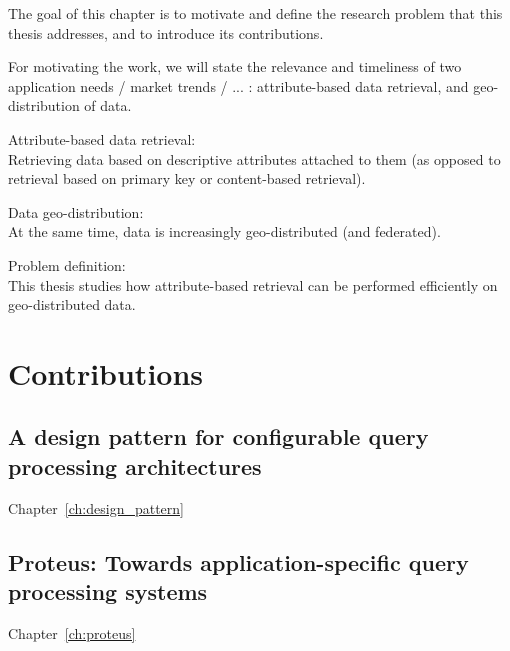 The goal of this chapter is to motivate and define the research problem that
this thesis addresses, and to introduce its contributions.

For motivating the work, we will state the relevance and timeliness of two
application needs / market trends / ... : attribute-based data retrieval, and
geo-distribution of data.

Attribute-based data retrieval: \\
Retrieving data based on descriptive attributes attached to them (as opposed to
retrieval based on primary key or content-based retrieval).

Data geo-distribution: \\
At the same time, data is increasingly geo-distributed (and federated).

Problem definition: \\
This thesis studies how attribute-based retrieval can be performed efficiently
on geo-distributed data.


\section{Contributions}
\subsection{A design pattern for configurable query processing architectures}
Chapter~\ref{ch:design_pattern}

\subsection{Proteus: Towards application-specific query processing systems}
Chapter~\ref{ch:proteus}